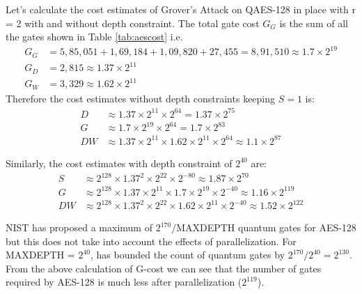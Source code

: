 \documentclass[preprint]{transcrypto}
\begin{document}
Let's calculate the cost estimates of Grover's Attack on QAES-128 in place with r = 2 with and without depth constraint. The total gate cost $G_G$ is the sum of all the gates shown in Table \ref{tab:aescost} i.e.
\begin{equation*}
    \begin{aligned}
        G_G &= 5,85,051 + 1,69,184 + 1,09,820 + 27,455 = 8,91,510 \approx 1.7 \times 2^{19} \\
        G_D &= 2,815 \approx 1.37 \times 2^{11} \\
        G_W &= 3,329 \approx 1.62 \times 2^{11}
    \end{aligned}
\end{equation*}
Therefore the cost estimates without depth constraints keeping $S = 1$ is:
\begin{equation*}
    \begin{aligned}
        D &\approx 1.37 \times 2^{11} \times 2^{64} = 1.37 \times 2^{75} \\
        G &\approx 1.7 \times 2^{19} \times 2^{64} = 1.7 \times 2^{83} \\
        DW &\approx 1.37\times 2^{11} \times 1.62 \times 2^{11} \times 2^{64} \approx 1.1 \times 2^{87}
    \end{aligned}
\end{equation*}

Similarly, the cost estimates with depth constraint of $2^{40}$ are:
\begin{equation*}
    \begin{aligned}
        S &\approx 2^{128}\times 1.37^2 \times 2^{22} \times 2^{-80} \approx 1.87 \times 2^{70} \\
        G &\approx 2^{128} \times 1.37 \times 2^{11} \times 1.7 \times 2^{19} \times 2^{-40} \approx 1.16 \times 2^{119} \\
        DW &\approx 2^{128} \times 1.37^2 \times 2^{22} \times 1.62 \times 2^{11} \times 2^{-40} \approx 1.52 \times 2^{122}
    \end{aligned} 
\end{equation*}

NIST\cite{nist} has proposed a maximum of $2^{170}/$MAXDEPTH quantum gates for AES-128 but this does not take into account the effects of parallelization. For MAXDEPTH = $2^{40}$, \cite{nist} has bounded the count of quantum gates by $2^{170}/2^{40} = 2^{130}$. From the above calculation of G-cost we can see that the number of gates required by AES-128 is much less after parallelization ($2^{119}$).
\end{document}
